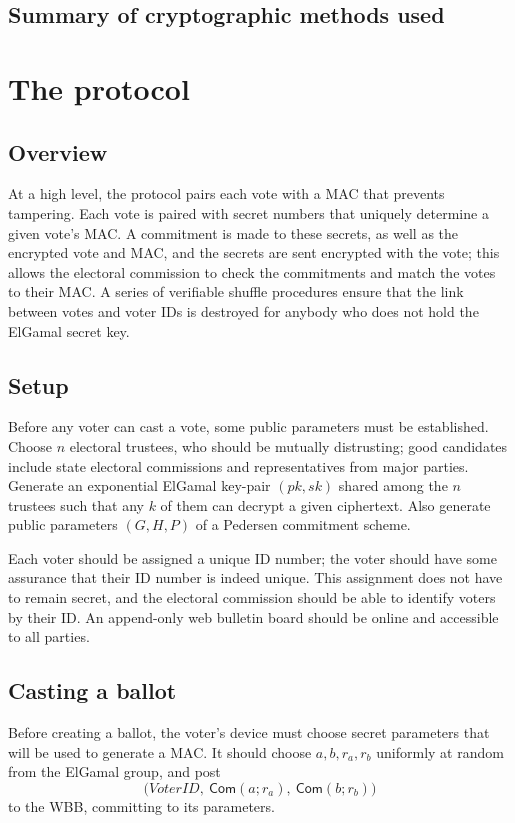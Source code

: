 \documentclass[12pt,a4paper]{article}
\newcommand{\commit}{\mathsf{Com}}
\theoremstyle{definition}
\newcommand{\VoterID}{\mathit{VoterID}}
\begin{document}
\subsection{Summary of cryptographic methods used}
\section{The protocol}\label{sec-protocol}
\subsection{Overview}
At a high level, the protocol pairs each vote with a MAC that prevents tampering. Each vote is paired with secret numbers that uniquely determine a given vote's MAC. A commitment is made to these secrets, as well as the encrypted vote and MAC, and the secrets are sent encrypted with the vote; this allows the electoral commission to check the commitments and match the votes to their MAC. A series of verifiable shuffle procedures ensure that the link between votes and voter IDs is destroyed for anybody who does not hold the ElGamal secret key.

\subsection{Setup}
Before any voter can cast a vote, some public parameters must be established. Choose $n$ electoral trustees, who should be mutually distrusting; good candidates include state electoral commissions and representatives from major parties. Generate an exponential ElGamal key-pair $(pk, sk)$ shared among the $n$ trustees such that any $k$ of them can decrypt a given ciphertext. Also generate public parameters $(G, H, P)$ of a Pedersen commitment scheme.

Each voter should be assigned a unique ID number; the voter should have some assurance that their ID number is indeed unique. This assignment does not have to remain secret, and the electoral commission should be able to identify voters by their ID. An append-only web bulletin board should be online and accessible to all parties.
\subsection{Casting a ballot}
Before creating a ballot, the voter's device must choose secret parameters that will be used to generate a MAC. It should choose $a,b,r_a,r_b$ uniformly at random from the ElGamal group, and post
$$\big(\VoterID,\ \commit(a;r_a),\ \commit(b;r_b)\big)$$
to the WBB, committing to its parameters.
\end{document}
